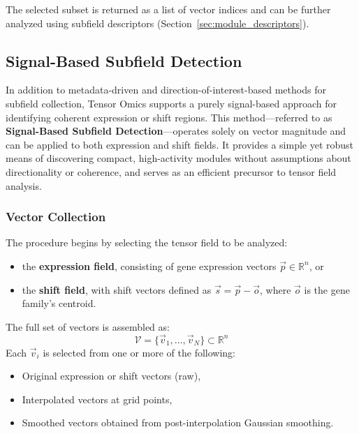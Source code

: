             The selected subset is returned as a list of vector indices and can be further analyzed using subfield descriptors (Section~\ref{sec:module_descriptors}).

    \subsection{Signal-Based Subfield Detection}\label{sec:signal_based_subfield_detection}

        In addition to metadata-driven and direction-of-interest-based methods for subfield collection, Tensor Omics supports a purely signal-based approach for identifying coherent expression or shift regions. This method—referred to as \textbf{Signal-Based Subfield Detection}—operates solely on vector magnitude and can be applied to both expression and shift fields. It provides a simple yet robust means of discovering compact, high-activity modules without assumptions about directionality or coherence, and serves as an efficient precursor to tensor field analysis.

        \subsubsection{Vector Collection}

            The procedure begins by selecting the tensor field to be analyzed:

            \begin{itemize}
                \item the \textbf{expression field}, consisting of gene expression vectors \( \vec{p} \in \mathbb{R}^n \), or
                \item the \textbf{shift field}, with shift vectors defined as \( \vec{s} = \vec{p} - \vec{o} \), where \( \vec{o} \) is the gene family's centroid.
            \end{itemize}

            The full set of vectors is assembled as:
            \[
                \mathcal{V} = \{ \vec{v}_1, \dots, \vec{v}_N \} \subset \mathbb{R}^n
            \]
            Each \( \vec{v}_i \) is selected from one or more of the following:

            \begin{itemize}
                \item Original expression or shift vectors (raw),
                \item Interpolated vectors at grid points,
                \item Smoothed vectors obtained from post-interpolation Gaussian smoothing.
            \end{itemize}

